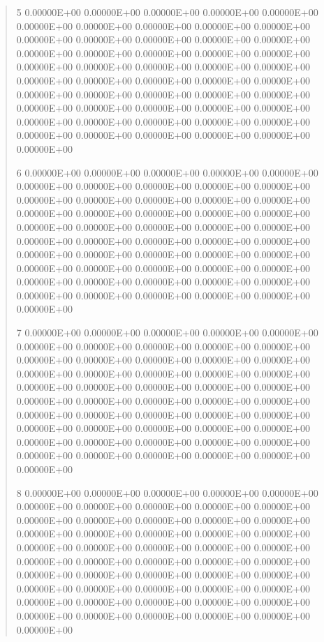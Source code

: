 \documentclass[letterpaper,10pt,english]{sphinxmanual}
\begin{document}
\begin{quote}
\begin{DUlineblock}{0em}
\begin{DUlineblock}{\DUlineblockindent}
\item[] 5   0.00000E+00  0.00000E+00  0.00000E+00  0.00000E+00  0.00000E+00  0.00000E+00  0.00000E+00  0.00000E+00  0.00000E+00  0.00000E+00  0.00000E+00  0.00000E+00  0.00000E+00  0.00000E+00  0.00000E+00  0.00000E+00  0.00000E+00  0.00000E+00  0.00000E+00  0.00000E+00  0.00000E+00  0.00000E+00  0.00000E+00  0.00000E+00  0.00000E+00  0.00000E+00  0.00000E+00  0.00000E+00  0.00000E+00  0.00000E+00  0.00000E+00  0.00000E+00  0.00000E+00  0.00000E+00  0.00000E+00  0.00000E+00  0.00000E+00  0.00000E+00  0.00000E+00  0.00000E+00  0.00000E+00  0.00000E+00  0.00000E+00  0.00000E+00  0.00000E+00  0.00000E+00  0.00000E+00  0.00000E+00  0.00000E+00  0.00000E+00  0.00000E+00
\item[] 6   0.00000E+00  0.00000E+00  0.00000E+00  0.00000E+00  0.00000E+00  0.00000E+00  0.00000E+00  0.00000E+00  0.00000E+00  0.00000E+00  0.00000E+00  0.00000E+00  0.00000E+00  0.00000E+00  0.00000E+00  0.00000E+00  0.00000E+00  0.00000E+00  0.00000E+00  0.00000E+00  0.00000E+00  0.00000E+00  0.00000E+00  0.00000E+00  0.00000E+00  0.00000E+00  0.00000E+00  0.00000E+00  0.00000E+00  0.00000E+00  0.00000E+00  0.00000E+00  0.00000E+00  0.00000E+00  0.00000E+00  0.00000E+00  0.00000E+00  0.00000E+00  0.00000E+00  0.00000E+00  0.00000E+00  0.00000E+00  0.00000E+00  0.00000E+00  0.00000E+00  0.00000E+00  0.00000E+00  0.00000E+00  0.00000E+00  0.00000E+00  0.00000E+00
\item[] 7   0.00000E+00  0.00000E+00  0.00000E+00  0.00000E+00  0.00000E+00  0.00000E+00  0.00000E+00  0.00000E+00  0.00000E+00  0.00000E+00  0.00000E+00  0.00000E+00  0.00000E+00  0.00000E+00  0.00000E+00  0.00000E+00  0.00000E+00  0.00000E+00  0.00000E+00  0.00000E+00  0.00000E+00  0.00000E+00  0.00000E+00  0.00000E+00  0.00000E+00  0.00000E+00  0.00000E+00  0.00000E+00  0.00000E+00  0.00000E+00  0.00000E+00  0.00000E+00  0.00000E+00  0.00000E+00  0.00000E+00  0.00000E+00  0.00000E+00  0.00000E+00  0.00000E+00  0.00000E+00  0.00000E+00  0.00000E+00  0.00000E+00  0.00000E+00  0.00000E+00  0.00000E+00  0.00000E+00  0.00000E+00  0.00000E+00  0.00000E+00  0.00000E+00
\item[] 8   0.00000E+00  0.00000E+00  0.00000E+00  0.00000E+00  0.00000E+00  0.00000E+00  0.00000E+00  0.00000E+00  0.00000E+00  0.00000E+00  0.00000E+00  0.00000E+00  0.00000E+00  0.00000E+00  0.00000E+00  0.00000E+00  0.00000E+00  0.00000E+00  0.00000E+00  0.00000E+00  0.00000E+00  0.00000E+00  0.00000E+00  0.00000E+00  0.00000E+00  0.00000E+00  0.00000E+00  0.00000E+00  0.00000E+00  0.00000E+00  0.00000E+00  0.00000E+00  0.00000E+00  0.00000E+00  0.00000E+00  0.00000E+00  0.00000E+00  0.00000E+00  0.00000E+00  0.00000E+00  0.00000E+00  0.00000E+00  0.00000E+00  0.00000E+00  0.00000E+00  0.00000E+00  0.00000E+00  0.00000E+00  0.00000E+00  0.00000E+00  0.00000E+00

\end{DUlineblock}
\end{DUlineblock}
\end{quote}
\end{document}
